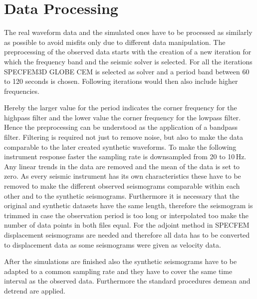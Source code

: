 \section{Data Processing}

The real waveform data and the simulated ones have to be processed as similarly as possible to avoid misfits only due
to different data manipulation. 
The preprocessing of the observed data starts with the creation of a new iteration for which the frequency band and 
the seismic solver is selected.
For all the iterations SPECFEM3D GLOBE CEM is selected as solver and a period band between 60 to 120 seconds is chosen.
Following iterations would then also include higher frequencies.


Hereby the larger value for the period indicates the corner frequency for the highpass filter and the lower value the 
corner frequency for the lowpass filter. Hence the preprocessing can be understood as the application of a bandpass filter. 
Filtering is required not just to remove noise, but also to make the data comparable to the later created synthetic waveforms.
To make the following instrument response faster the sampling rate is downsampled from 20 to 10$\,$Hz.
Any linear trends in the data are removed and the mean of the data is set to zero.
%
As every seismic instrument has its own characteristics these have to be removed to make the different observed seismograms 
comparable within each other and to the synthetic seismograms.
%
Furthermore it is necessary that the original and synthetic datasets have the same length, therefore the seismogram is trimmed in case 
the observation period is too long or interpolated too make the number of data points in both files equal. 
For the adjoint method in SPECFEM displacement seismograms are needed and therefore all data has to be converted to 
displacement data as some seismograms were given as velocity data.

After the simulations are finished also the synthetic seismograms have to be adapted to a common sampling rate and 
they have to cover the same time interval as the observed data.
Furthermore the standard procedures demean and detrend are applied.









